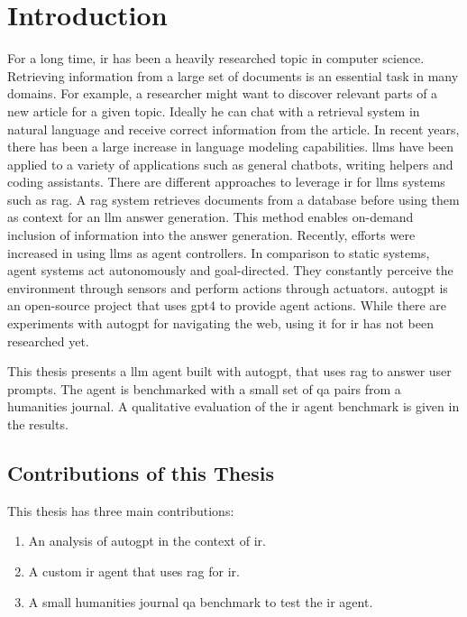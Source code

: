 \documentclass[../main.tex]{subfiles}
\begin{document}
\chapter{Introduction}
\label{ch:introduction}

For a long time, \gls{ir} has been a heavily researched topic in computer science.
Retrieving information from a large set of documents is an essential task in many domains.
For example,
a researcher might want to discover relevant parts of a new article for a given topic.
Ideally he can chat with a retrieval system in natural language
and receive correct information from the article.
In recent years, there has been a large increase in language modeling capabilities.
\Glspl{llm} have been applied to a variety of applications such as general chatbots,
writing helpers and coding assistants.
There are different approaches to leverage \gls{ir} for \glspl{llm} systems such as \gls{rag}.
A \Gls{rag} system retrieves documents from a database before using them as context
for an \gls{llm} answer generation.
This method enables on-demand inclusion of information into the answer generation.
Recently, efforts were increased in using \glspl{llm} as agent controllers.
In comparison to static systems, agent systems act autonomously and goal-directed.
They constantly perceive the environment through sensors and perform actions
through actuators.
\Gls{autogpt} is an open-source project that uses \gls{gpt4} to provide agent
actions.
While there are experiments with \gls{autogpt} for navigating the web,
using it for \gls{ir} has not been researched yet.

This thesis presents a \gls{llm} agent built with \gls{autogpt},
that uses \gls{rag} to answer user prompts.
The agent is benchmarked with a small set of \gls{qa} pairs from a humanities journal.
A qualitative evaluation of the \gls{ir} agent benchmark is given in the results.

\section{Contributions of this Thesis}

This thesis has three main contributions:
\begin{enumerate}
    \item An analysis of \gls{autogpt} in the context of \gls{ir}.
    \item A custom \gls{ir} agent that uses \gls{rag} for \gls{ir}.
    \item A small humanities journal \gls{qa} benchmark to test the \gls{ir} agent.
\end{enumerate}
\end{document}
